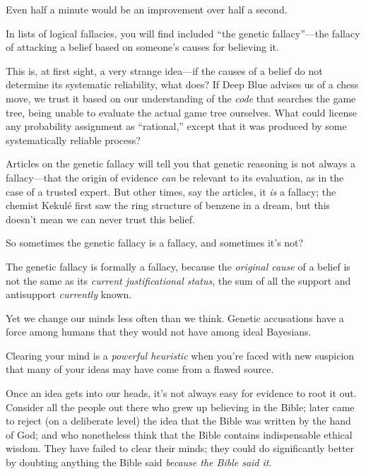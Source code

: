 {
 Even half a minute would be an improvement over half a second.}

\myendsectiontext


\bigskip


{
 In lists of logical fallacies, you will find included
``the genetic fallacy''---the
fallacy of attacking a belief based on someone's causes
for believing it. }

{
 This is, at first sight, a very strange idea---if the causes of a
belief do not determine its systematic reliability, what does? If Deep
Blue advises us of a chess move, we trust it based on our understanding
of the \textit{code} that searches the game tree, being unable to
evaluate the actual game tree ourselves. What could license any
probability assignment as
``rational,'' except that it was
produced by some systematically reliable process?}

{
 Articles on the genetic fallacy will tell you that genetic
reasoning is not always a fallacy---that the origin of evidence
\textit{can} be relevant to its evaluation, as in the case of a trusted
expert. But other times, say the articles, it \textit{is} a fallacy;
the chemist Kekulé first saw the ring structure of benzene in a dream,
but this doesn't mean we can never trust this belief.}

{
 So sometimes the genetic fallacy is a fallacy, and sometimes
it's not?}

{
 The genetic fallacy is formally a fallacy, because the
\textit{original cause} of a belief is not the same as its
\textit{current justificational status}, the sum of all the support and
antisupport \textit{currently} known.}

{
 Yet we change our minds less often than we think. Genetic
accusations have a force among humans that they would not have among
ideal Bayesians.}

{
 Clearing your mind is a \textit{powerful heuristic} when
you're faced with new suspicion that many of your ideas
may have come from a flawed source.}

{
 Once an idea gets into our heads, it's not always
easy for evidence to root it out. Consider all the people out there who
grew up believing in the Bible; later came to reject (on a deliberate
level) the idea that the Bible was written by the hand of God; and who
nonetheless think that the Bible contains indispensable ethical wisdom.
They have failed to clear their minds; they could do significantly
better by doubting anything the Bible said \textit{because the Bible
said it}.}

